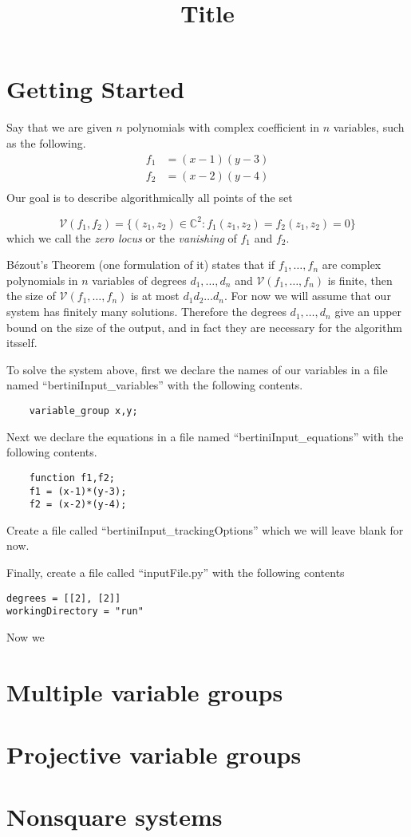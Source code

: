 \documentclass[12pt]{article}
\title{\large \bf
Title
}
\author{}
\newcommand{\C}{\mathbb{C}}
\begin{document}
\maketitle
\section{Getting Started}
Say that we are given $n$ polynomials
with complex coefficient in $n$ variables, such as the 
following. 
\begin{align*}
    f_1 &= (x-1)(y-3)\\
    f_2 &= (x-2)(y-4)\\
\end{align*}
Our goal is to describe algorithmically all points of the set 

\[
    \mathcal{V}(f_1, f_2) = \{(z_1,z_2) \in \C^2 : f_1(z_1, z_2) = 
    f_2(z_1, z_2) = 0\}
\]
which we call the \emph{zero locus} or the \emph{vanishing} of $f_1$ and 
$f_2$. 

B\'{e}zout's Theorem (one formulation of it) states that if 
$f_1, \ldots, f_n$ are complex polynomials in $n$ variables of degrees 
$d_1, \ldots, d_n$ and $\mathcal{V}(f_1, \ldots, f_n)$ is finite, then 
the size of $\mathcal{V}(f_1, \ldots, f_n)$ is at most $d_1d_2 \ldots d_n$. 
For now we will assume that our system has finitely many solutions.
Therefore the degrees $d_1, \ldots, d_n$ give an upper bound on the size 
of the output, and in fact they are necessary for the algorithm itsself.

To solve the system above, first we declare the names of our variables 
in a file named ``bertiniInput\_variables'' with the following contents.

\begin{lstlisting}
    variable_group x,y; 
\end{lstlisting}

Next we declare the equations in a file named ``bertiniInput\_equations'' 
with the following contents.

\begin{lstlisting}
    function f1,f2;
    f1 = (x-1)*(y-3);
    f2 = (x-2)*(y-4);
\end{lstlisting}

Create a file called ``bertiniInput\_trackingOptions'' which we will 
leave blank for now.

Finally, create a file called ``inputFile.py'' with the following 
contents
\begin{lstlisting}
degrees = [[2], [2]]
workingDirectory = "run"
\end{lstlisting}

Now we 

\section{Multiple variable groups}
\section{Projective variable groups}
\section{Nonsquare systems}
\end{document}
